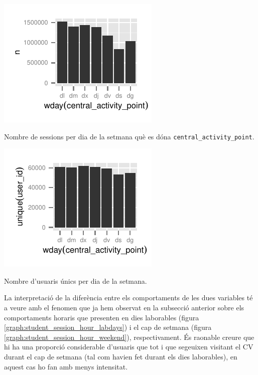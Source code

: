 \documentclass[
	a4paper,
	twoside,
	justified
]{tufte-book}
\begin{document}
\begin{marginfigure}
\begin{center}
\includegraphics{sessions_wday_bar}
\caption{
	\label{graph:sessions_wday_bar}
	Nombre de sessions per dia de la setmana què es dóna \texttt{central\_activity\_point}. 
}
\end{center}
\end{marginfigure}

\begin{marginfigure}
\begin{center}
\includegraphics{users_wday_bar}
\caption{
	\label{graph:users_wday_bar}
	Nombre d'usuaris únics per dia de la setmana. 
}
\end{center}
\end{marginfigure} 

La interpretació de la diferència entre els comportaments de les dues variables té a veure amb el fenomen que ja hem observat en la subsecció anterior sobre els comportaments horaris que presenten en dies laborables (figura \ref{graph:student_session_hour_labdays}) i el cap de setmana (figura \ref{graph:student_session_hour_weekend}), respectivament. És raonable creure que hi ha una proporció considerable d'usuaris que tot i que segeuixen visitant el CV durant el cap de setmana (tal com havien fet durant els dies laborables), en aquest cas ho fan amb menys intensitat. 
\end{document}
